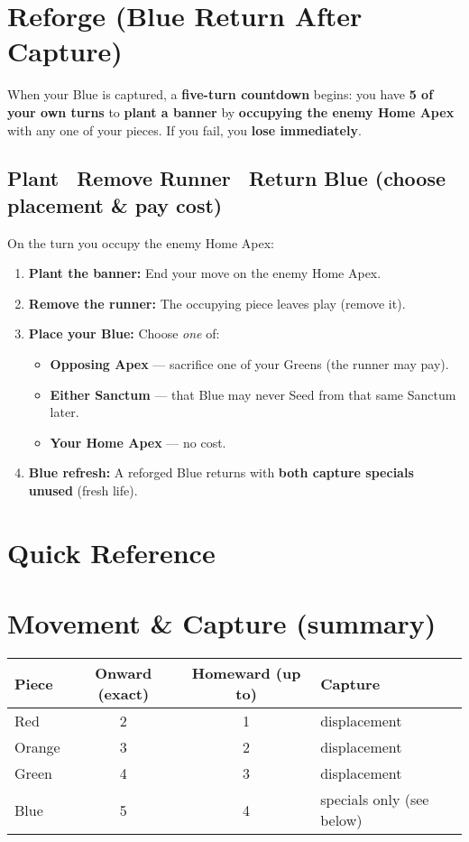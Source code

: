 \documentclass[11pt]{article}
\begin{document}
\section{Reforge (Blue Return After Capture)}\label{sec:reforge}
When your Blue is captured, a \textbf{five-turn countdown} begins: you have \textbf{5 of your own turns} to \textbf{plant a banner} by \textbf{occupying the enemy Home Apex} with any one of your pieces. If you fail, you \textbf{lose immediately}.

\subsection*{Plant \textrightarrow\ Remove Runner \textrightarrow\ Return Blue (choose placement & pay cost)}
On the turn you occupy the enemy Home Apex:
\begin{enumerate}
  \item \textbf{Plant the banner:} End your move on the enemy Home Apex.
  \item \textbf{Remove the runner:} The occupying piece leaves play (remove it).
  \item \textbf{Place your Blue:} Choose \emph{one} of:
  \begin{itemize}
     \item \textbf{Opposing Apex} — sacrifice one of your Greens (the runner may pay).
     \item \textbf{Either Sanctum} — that Blue may never Seed from that same Sanctum later.
  \item \textbf{Your Home Apex} — no cost.
  \end{itemize}
  \item \textbf{Blue refresh:} A reforged Blue returns with \textbf{both capture specials unused} (fresh life).
\end{enumerate}



\section{Quick Reference}
\label{sec:quickreference}


\section*{Movement \& Capture (summary)}
\begin{tabularx}{\linewidth}{@{}l c c l@{}}
\toprule
\textbf{Piece} & \textbf{Onward (exact)} & \textbf{Homeward (up to)} & \textbf{Capture}\\
\midrule
Red    & 2 & 1 & displacement\\
Orange & 3 & 2 & displacement\\
Green  & 4 & 3 & displacement\\
Blue   & 5 & 4 & specials only (see below)\\
\bottomrule
\end{tabularx}
\end{document}
